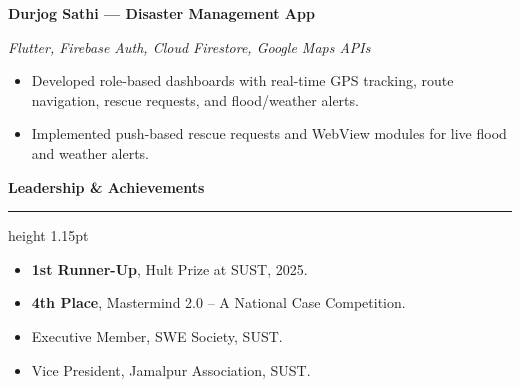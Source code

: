 \documentclass[11pt,a4paper]{article}
\newcommand{\resumesection}[1]{%
  \vspace{4.5pt}%
  {\fontsize{13}{14}\selectfont\bfseries\color{techBlue}#1}\par
  \vspace{6.5pt}\nointerlineskip
  {\color{techBlue}\hrule height 1.15pt}%
  \vspace{4.5pt}
}
\newcommand{\project}[2]{%
  {\fontsize{12}{12.8}\selectfont\bfseries #1}\par
  {\fontsize{11}{11.6}\selectfont\itshape\color{resumeBlue}#2}\par
}
\newenvironment{resumelist}{%
  \begin{itemize}[leftmargin=18pt,label=\textbullet,itemsep=0.9pt,topsep=0pt,
    parsep=0pt,partopsep=0pt]
}{\end{itemize}}
\begin{document}
\project{Durjog Sathi --- Disaster Management App}{Flutter, Firebase Auth, Cloud Firestore, Google Maps APIs}
\begin{resumelist}
  \item Developed role-based dashboards with real-time GPS tracking, route navigation, rescue requests, and flood/weather alerts.
  \item Implemented push-based rescue requests and WebView modules for live flood and weather alerts.
\end{resumelist}

\resumesection{Leadership \& Achievements}
\begin{resumelist}
  \item \textbf{1st Runner-Up}, Hult Prize at SUST, 2025.
  \item \textbf{4th Place}, Mastermind 2.0 -- A National Case Competition.
  \item Executive Member, SWE Society, SUST.
  \item Vice President, Jamalpur Association, SUST.
\end{resumelist}
\end{document}
